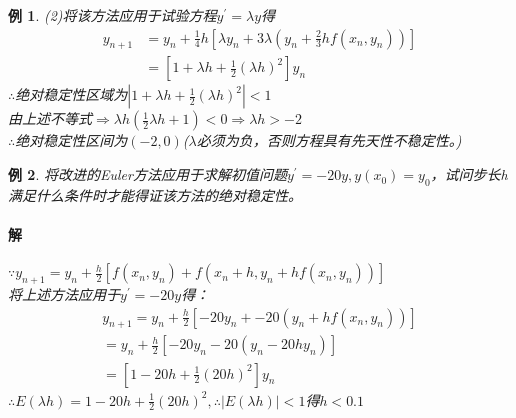 \documentclass{article}
\newtheorem{example}{例}
\begin{document}
\begin{example}
    (2)将该方法应用于试验方程$y^{'}=\lambda y$得
    \begin{equation*}
        \begin{split}
            y_{n+1}&=y_n+\frac{1}{4}h[\lambda y_n+3\lambda (y_n+\frac{2}{3}hf(x_n, y_n))] \\
            &=[1+\lambda h+\frac{1}{2}(\lambda h)^2]y_n
        \end{split}
    \end{equation*}
    $\therefore$绝对稳定性区域为$|1+\lambda h + \frac{1}{2}(\lambda h)^2|<1$\\
    由上述不等式$\Rightarrow \lambda h(\frac{1}{2}\lambda h+1)<0 \Rightarrow \lambda h>-2 $\\
    $\therefore $绝对稳定性区间为$(-2,0)$($\lambda$必须为负，否则方程具有先天性不稳定性。)
\end{example}

\begin{example}
    将改进的Euler方法应用于求解初值问题$y^{'}=-20y, y(x_0)=y_0 $，试问步长h满足什么条件时才能得证该方法的绝对稳定性。
    
    \paragraph{解}$\because y_{n+1}=y_n+\frac{h}{2}[f(x_n, y_n)+f(x_n+h, y_n+hf(x_n,y_n))] $\\
    将上述方法应用于$y^{'}=-20y$得：
    $$
    \begin{array}{lr}
        y_{n+1}=y_n+\frac{h}{2}[-20y_n+-20(y_n+hf(x_n, y_n))]\\
        =y_n+\frac{h}{2}[-20y_n-20(y_n-20hy_n)] \\
        =[1-20h+\frac{1}{2}(20h)^2]y_n
    \end{array}
    $$
    $\therefore E(\lambda h)=1-20h+\frac{1}{2}(20h)^2, \therefore |E(\lambda h)|<1 $得$h <0.1$
\end{example}
\end{document}
